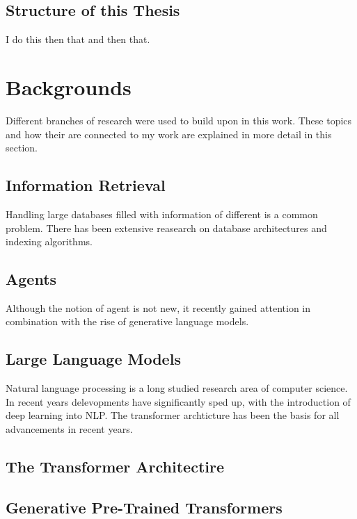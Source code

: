 \documentclass[english, version-2022-01]{uzl-thesis}
\begin{document}
\section{Structure of this Thesis}
I do this then that and then that.

\chapter{Backgrounds}

Different branches of research were used to build upon in this work. These topics and how their are connected to my work are explained in more detail in this section.

\section{Information Retrieval}

Handling large databases filled with information of different is a common problem. There has been extensive reasearch on database architectures and indexing algorithms.

\section{Agents}

Although the notion of agent is not new, it recently gained attention in combination with the rise of generative language models.

\section{Large Language Models}

Natural language processing is a long studied research area of computer science.
In recent years delevopments have significantly sped up, with the introduction of deep learning into NLP.
The transformer archticture has been the basis for all advancements in recent years.

\section{The Transformer Architectire}


\section{Generative Pre-Trained Transformers}

\end{document}

